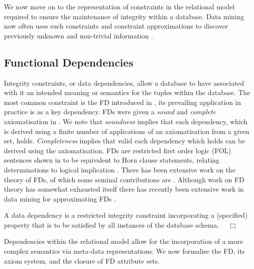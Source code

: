 We now move on to the representation of constraints in the relational
model required to ensure the maintenance of integrity within a
database. Data mining now often uses such constraints and constraint
approximations to discover previously unknown and non-trivial
information \cite{kdd96}.


\subsection{Functional Dependencies}
Integrity constraints, or data dependencies, allow a database to have
associated with it an intended meaning or semantics for the tuples
within the database.  The most common
constraint is the FD introduced in
\cite{cod72}, its prevailing application in practice is as
a key dependency.  FDs were given a {\em sound} and
{\em complete} axiomatisation in \cite{Arms74}.  We note that {\em
soundness} implies that each dependency, which is derived using a
finite number of applications of an axiomatisation from a given set,
holds. {\em Completeness} implies that valid each dependency which holds can be
derived using the axiomatisation. FDs
are restricted first order logic (FOL) sentences shown in
\cite{sdpf81} to be equivalent to Horn clause statements, relating
determinations to logical implication \cite{fag77,logicfound,mak87}. 
There has been extensive work on the theory of FDs,
of which some seminal contributions are
\cite{Arms74,fag77,bb79,sdpf81}. Although work on FD theory has somewhat
exhausted itself there has recently been extensive work in data mining for
approximating FDs \cite{Mann92,sf93,bb95,hkp98}.

\begin{definition}
\begin{rm}
A data dependency is a restricted integrity constraint incorporating a
(specified) property that is to be satisfied by all instances of the database
schema. $\quad\Box$
\end{rm}
\end{definition}

Dependencies within the relational model allow for the incorporation of a more
complex semantics via meta-data representations. We now formalise the
FD, its axiom system, and the closure of FD attribute sets. 

